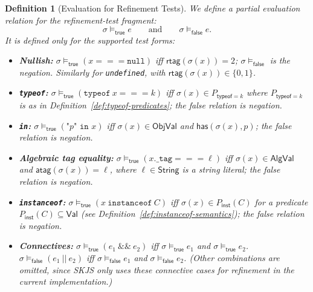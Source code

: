 \documentclass[11pt]{article}
\newtheorem{definition}[theorem]{Definition}
\newcommand{\ObjVal}{\mathsf{ObjVal}}
\newcommand{\String}{\mathsf{String}}
\newcommand{\AlgVal}{\mathsf{AlgVal}}
\newcommand{\rtag}{\mathsf{rtag}}
\newcommand{\Val}{\mathsf{Val}}
\begin{document}
\begin{definition}[Evaluation for Refinement Tests]
\label{def:refine-eval}
We define a partial evaluation relation for the refinement-test fragment:
\[
\sigma \models_{\mathsf{true}} e
\qquad\text{and}\qquad
\sigma \models_{\mathsf{false}} e.
\]
It is defined only for the supported test forms:
\begin{itemize}
\item \textbf{Nullish:} $\sigma \models_{\mathsf{true}} (x===\texttt{null})$ iff $\rtag(\sigma(x))=2$; $\sigma \models_{\mathsf{false}}$ is the negation.
Similarly for \texttt{undefined}, with $\rtag(\sigma(x))\in\{0,1\}$.
\item \textbf{\texttt{typeof}:} $\sigma \models_{\mathsf{true}} (\texttt{typeof}\ x===k)$ iff $\sigma(x)\in P_{\mathsf{typeof}=k}$ where $P_{\mathsf{typeof}=k}$ is as in Definition~\ref{def:typeof-predicates}; the false relation is negation.
\item \textbf{\texttt{in}:} $\sigma \models_{\mathsf{true}} (\texttt{"}p\texttt{" in }x)$ iff $\sigma(x)\in\ObjVal$ and $\mathsf{has}(\sigma(x),p)$; the false relation is negation.
\item \textbf{Algebraic tag equality:} $\sigma \models_{\mathsf{true}} (x.\texttt{\_tag}===\ell)$ iff $\sigma(x)\in\AlgVal$ and $\mathsf{atag}(\sigma(x))=\ell$, where $\ell \in \String$ is a string literal; the false relation is negation.
\item \textbf{\texttt{instanceof}:} $\sigma \models_{\mathsf{true}} (x\ \texttt{instanceof}\ C)$ iff $\sigma(x)\in P_{\mathsf{inst}}(C)$ for a predicate $P_{\mathsf{inst}}(C)\subseteq \Val$ (see Definition~\ref{def:instanceof-semantics}); the false relation is negation.
\item \textbf{Connectives:}
  $\sigma \models_{\mathsf{true}} (e_1 \ \&\&\ e_2)$ iff $\sigma \models_{\mathsf{true}} e_1$ and $\sigma \models_{\mathsf{true}} e_2$.
  $\sigma \models_{\mathsf{false}} (e_1 \ ||\ e_2)$ iff $\sigma \models_{\mathsf{false}} e_1$ and $\sigma \models_{\mathsf{false}} e_2$.
  (Other combinations are omitted, since SKJS only uses these connective cases for refinement in the current implementation.)
\end{itemize}
\end{definition}
\end{document}
